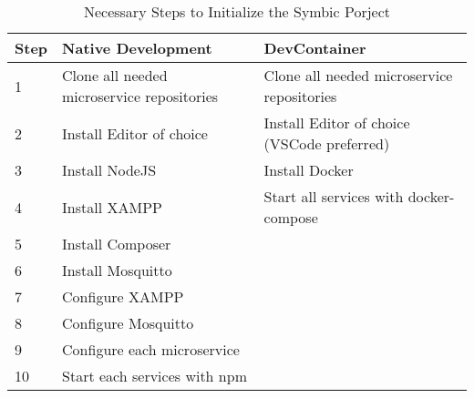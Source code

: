 \begin{table}[]
  \begin{tabular}{@{}lll@{}}
    \toprule
    \cellcolor[HTML]{FFFFFF}\textbf{Step} & \cellcolor[HTML]{FFFFFF}\textbf{Native Development}     & \cellcolor[HTML]{FFFFFF}\textbf{DevContainer}                           \\ \midrule
    \cellcolor[HTML]{DDDDDD}1  & \cellcolor[HTML]{0D8120}Clone all needed microservice repositories & \cellcolor[HTML]{0D8120}Clone all needed microservice repositories      \\
    \cellcolor[HTML]{DDDDDD}2  & \cellcolor[HTML]{DDDDDD}Install Editor of choice                   & \cellcolor[HTML]{DDDDDD}Install Editor of choice (\ac{VSCode} preferred)\\
    \cellcolor[HTML]{DDDDDD}3  & \cellcolor[HTML]{DDDDDD}Install NodeJS                             & \cellcolor[HTML]{DDDDDD}Install Docker                                  \\
    \cellcolor[HTML]{DDDDDD}4  & \cellcolor[HTML]{DDDDDD}Install \ac{XAMPP}                         & \cellcolor[HTML]{0D8120}Start all services with docker-compose          \\
    \cellcolor[HTML]{DDDDDD}5  & \cellcolor[HTML]{DDDDDD}Install Composer                           & \cellcolor[HTML]{DDDDDD}                                                \\
    \cellcolor[HTML]{DDDDDD}6  & \cellcolor[HTML]{DDDDDD}Install Mosquitto                          & \cellcolor[HTML]{DDDDDD}                                                \\
    \cellcolor[HTML]{DDDDDD}7  & \cellcolor[HTML]{DDDDDD}Configure \ac{XAMPP}                       & \cellcolor[HTML]{DDDDDD}                                                \\
    \cellcolor[HTML]{DDDDDD}8  & \cellcolor[HTML]{DDDDDD}Configure Mosquitto                        & \cellcolor[HTML]{DDDDDD}                                                \\
    \cellcolor[HTML]{DDDDDD}9  & \cellcolor[HTML]{DDDDDD}Configure each microservice                & \cellcolor[HTML]{DDDDDD}                                                \\
    \cellcolor[HTML]{DDDDDD}10 & \cellcolor[HTML]{0D8120}Start each services with npm               & \cellcolor[HTML]{DDDDDD}                                                \\ \bottomrule
  \end{tabular}
  \caption{Necessary Steps to Initialize the Symbic Porject}\label{tab::init_steps}
\end{table}